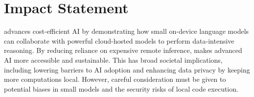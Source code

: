 \section*{Impact Statement}
\system advances cost-efficient AI by demonstrating how small on-device language models can collaborate with powerful cloud-hosted models to perform data-intensive reasoning. By reducing reliance on expensive remote inference, \system makes advanced AI more accessible and sustainable. This has broad societal implications, including lowering barriers to AI adoption and enhancing data privacy by keeping more computations local. However, careful consideration must be given to potential biases in small models and the security risks of local code execution. 